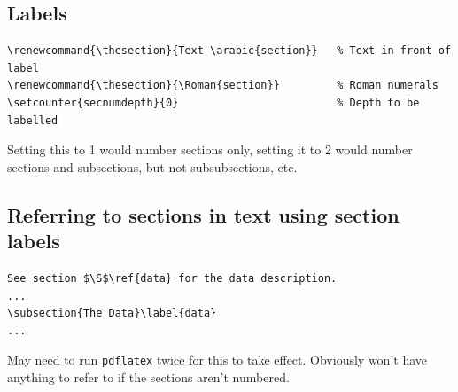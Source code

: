 \documentclass{article}
\begin{document}
\subsection{Labels}
\begin{lstlisting}
\renewcommand{\thesection}{Text \arabic{section}}   % Text in front of label
\renewcommand{\thesection}{\Roman{section}}         % Roman numerals
\setcounter{secnumdepth}{0}                         % Depth to be labelled
\end{lstlisting}
Setting this to 1 would number sections only, setting it to 2 would
number sections and subsections, but not subsubsections, etc.

\subsection{Referring to sections in text using section labels}
\begin{verbatim}
See section $\S$\ref{data} for the data description.
...
\subsection{The Data}\label{data}
...
\end{verbatim}
May need to run \texttt{pdflatex} twice for this to take effect.
Obviously won't have anything to refer to if the sections aren't numbered.
\end{document}
